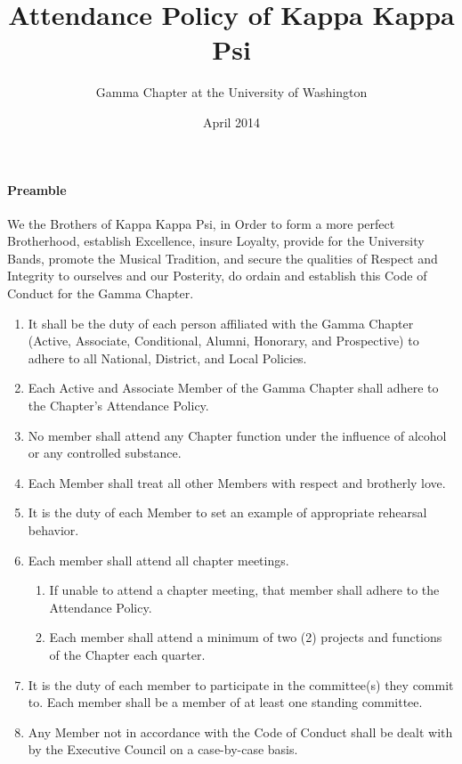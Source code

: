 \documentclass[11pt]{article}
\begin{document}
\title{Attendance Policy of Kappa Kappa Psi}
\author{Gamma Chapter at the University of Washington}
\date{April 2014}
\maketitle

\paragraph{Preamble}
We the Brothers of Kappa Kappa Psi, in Order to form a more perfect Brotherhood, establish Excellence, insure Loyalty, provide for the University Bands, promote the Musical Tradition, and secure the qualities of Respect and Integrity to ourselves and our Posterity, do ordain and establish this Code of Conduct for the Gamma Chapter. 

\begin{enumerate}[label=\bfseries Article \Roman*,align=left]
  \item  It shall be the duty of each person affiliated with the Gamma Chapter (Active, Associate, Conditional, Alumni, Honorary, and Prospective) to adhere to all National, District, and Local Policies.
  \item Each Active and Associate Member of the Gamma Chapter shall adhere to the Chapter’s Attendance Policy.
 
  \item No member shall attend any Chapter function under the influence of alcohol or any controlled substance.
 
  \item Each Member shall treat all other Members with respect and brotherly love.
 
  \item It is the duty of each Member to set an example of appropriate rehearsal behavior.
 
  \item Each member shall attend all chapter meetings.
  \begin{enumerate}[label=\arabic*]
    \item If unable to attend a chapter meeting, that member shall adhere to the Attendance Policy.
    \item Each member shall attend a minimum of two (2) projects and functions of the Chapter each quarter.
  \end{enumerate}

  \item  It is the duty of each member to participate in the committee(s) they commit to. Each member shall be a member of at least one standing committee.
 
  \item  Any Member not in accordance with the Code of Conduct shall be dealt with by the Executive Council on a case-by-case basis.
\end{enumerate}
\end{document}

